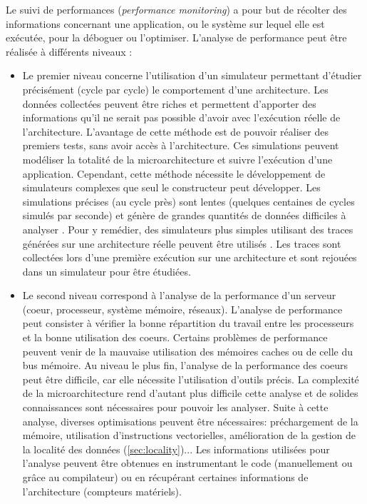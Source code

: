         Le suivi de performances (\textit{performance monitoring}) a pour but de récolter des informations concernant une application, ou le système sur lequel elle est exécutée, pour la déboguer ou l'optimiser. L'analyse de performance peut être réalisée à différents niveaux \cite{imbert2011tips} : 
        \begin{itemize}
            \item Le premier niveau concerne l'utilisation d'un simulateur permettant d'étudier précisément (cycle par cycle) le comportement d'une architecture. Les données collectées peuvent être riches et permettent d'apporter des informations qu'il ne serait pas possible d'avoir avec l'exécution réelle de l'architecture. L'avantage de cette méthode est de pouvoir réaliser des premiers tests, sans avoir accès à l'architecture. Ces simulations peuvent modéliser la totalité de la microarchitecture et suivre l'exécution d'une application. Cependant, cette méthode nécessite le développement de simulateurs complexes que seul le constructeur peut développer. Les simulations précises (au cycle près) sont lentes (quelques centaines de cycles simulés par seconde) et génère de grandes quantités de données difficiles à analyser \cite{palomares2015combining}. Pour y remédier, des simulateurs plus simples utilisant des traces générées sur une architecture réelle peuvent être utilisés \cite{Cmelik1995}. Les traces sont collectées lors d'une première exécution sur une architecture et sont rejouées dans un simulateur pour être étudiées.
            
            \item Le second niveau correspond à l'analyse de la performance d'un serveur (coeur, processeur, système mémoire, réseaux). L'analyse de performance peut consister à vérifier la bonne répartition du travail entre les processeurs et la bonne utilisation des coeurs. Certains problèmes de performance peuvent venir de la mauvaise utilisation des mémoires caches ou de celle du bus mémoire. Au niveau le plus fin, l'analyse de la performance des coeurs peut être difficile, car elle nécessite l'utilisation d'outils précis. La complexité de la microarchitecture rend d'autant plus difficile cette analyse et de solides connaissances sont nécessaires pour pouvoir les analyser. Suite à cette analyse, diverses optimisations peuvent être nécessaires: préchargement de la mémoire, utilisation d'instructions vectorielles, amélioration de la gestion de la localité des données (\autoref{sec:locality})... Les informations utilisées pour l'analyse peuvent être obtenues en instrumentant le code (manuellement ou grâce au compilateur) ou en récupérant certaines informations de l'architecture (compteurs matériels).
            

\end{itemize}
